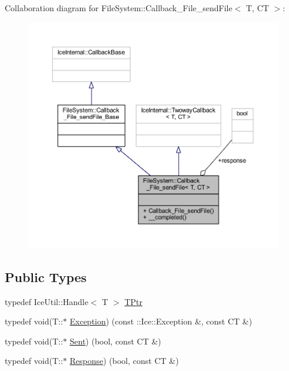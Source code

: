 Collaboration diagram for File\+System\+:\+:Callback\+\_\+\+File\+\_\+send\+File$<$ T, C\+T $>$\+:
\nopagebreak
\begin{figure}[H]
\begin{center}
\leavevmode
\includegraphics[width=350pt]{class_file_system_1_1_callback___file__send_file__coll__graph}
\end{center}
\end{figure}
\subsection*{Public Types}
\begin{DoxyCompactItemize}
\item 
typedef Ice\+Util\+::\+Handle$<$ T $>$ \hyperlink{class_file_system_1_1_callback___file__send_file_a666a8ba5af39dac36fdcb52b0916e2b9}{T\+Ptr}
\item 
typedef void(T\+::$\ast$ \hyperlink{class_file_system_1_1_callback___file__send_file_a625b27b53ceb949eaa41ae4908958999}{Exception}) (const \+::Ice\+::\+Exception \&, const C\+T \&)
\item 
typedef void(T\+::$\ast$ \hyperlink{class_file_system_1_1_callback___file__send_file_ac3926735f3de742485a01c7e0e08dd2d}{Sent}) (bool, const C\+T \&)
\item 
typedef void(T\+::$\ast$ \hyperlink{class_file_system_1_1_callback___file__send_file_a3d604d3396d90e28e0f498d66e31e906}{Response}) (bool, const C\+T \&)
\end{DoxyCompactItemize}
